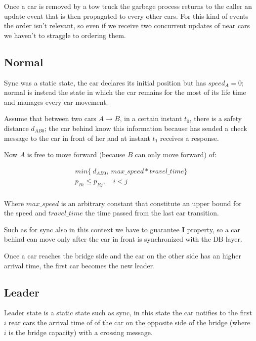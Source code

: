 Once a car is removed by a tow truck the garbage process returns to the caller 
an update event that is then propagated to every other cars. For this kind of events 
the order isn't relevant, so even if we receive two concurrent updates of near cars 
we haven't to straggle to ordering them.


\subsection{Normal}

Sync was a static state, the car declares its initial position but has $speed_A = 0$;
normal is instead the state in which the car remains for the most of its life time and 
manages every car movement.

Assume that between two cars $A \rightarrow B$, in a certain instant $t_0$, 
there is a safety distance $d_{AB0}$; 
the car behind know this information because has sended a check message to the car 
in front of her and at instant $t_1$ receives a response.

Now $A$ is free to move forward (because $B$ can only move forward) of:

\begin{equation}\begin{split}
    & min\{\ d_{AB0},\ max\_speed * travel\_time \} \\
    & p_{Bi} \leq p_{Bj},\quad i < j \\
\end{split}\end{equation}    

Where $max\_speed$ is an arbitrary constant that constitute an upper bound for the speed 
and $travel\_time$ the time passed from the last car transition. 

Such as for sync also in this context we have to guarantee \textbf{I} property, so 
a car behind can move only after the car in front is synchronized with the DB layer.

Once a car reaches the bridge side and the car on the other side has an 
higher arrival time, the first car becomes the new leader.


\subsection{Leader}

Leader state is a static state such as sync, in this state the car notifies to 
the first $i$ rear cars the arrival time of of the car on the opposite side of the bridge 
(where $i$ is the bridge capacity) with a crossing message.

